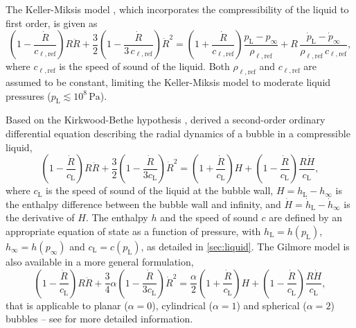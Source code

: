The Keller-Miksis model \citep{Keller1980, Prosperetti1986}, which incorporates the compressibility of the liquid to first order, is given as
\begin{equation}
\left(1 - \frac{\dot{R}}{c_{\ell,\mathrm{ref}}}\right) R \ddot{R} + \frac{3}{2} \left(1 - \frac{\dot{R}}{3\, c_{\ell,\mathrm{ref}}}\right) \dot{R}^2 =  \left(1 + \frac{\dot{R}}{c_{\ell,\mathrm{ref}}}\right) \frac{p_\text{L} - p_\infty}{\rho_{\ell,\mathrm{ref}}} + R \, \frac{\dot{p}_\text{L} - \dot{p}_\infty}{\rho_{\ell,\mathrm{ref}} \, c_{\ell,\mathrm{ref}}} ,
\label{eq:keller}
\end{equation}
where $c_{\ell,\mathrm{ref}}$ is the speed of sound of the liquid. Both $\rho_{\ell,\mathrm{ref}}$ and $c_{\ell,\mathrm{ref}}$ are assumed to be constant, limiting the Keller-Miksis model to moderate liquid pressures ($p_\mathrm{L} \lesssim 10^8 \, \mathrm{Pa}$).

Based on the Kirkwood-Bethe hypothesis \citep{Kirkwood1942,Denner2024a}, \citet{Gilmore1952} derived a second-order ordinary differential equation describing the radial dynamics of a bubble in a compressible liquid, %
\begin{equation}
  \left( 1 - \frac{\dot{R}}{c_\text{L}} \right) R \ddot{R} + \frac{3}{2} \left( 1 - \frac{\dot{R}}{3 c_\text{L}} \right) \dot{R}^2  = \left( 1 + \frac{\dot{R}}{c_\text{L}} \right) H + \left( 1- \frac{\dot{R}}{c_\text{L}} \right) \frac{R \dot{H}}{c_\text{L}}, \label{eq:gilmore}
\end{equation} 
where $c_\mathrm{L}$ is the speed of sound of the liquid at the bubble wall, $H = h_\text{L} - h_\infty$ is the enthalpy difference between the bubble wall and infinity, and $\dot{H} = \dot{h}_\text{L} - \dot{h}_\infty$ is the derivative of $H$. The enthalpy $h$ and the speed of sound $c$ are defined by an appropriate equation of state as a function of pressure, with $h_\text{L} = h(p_\text{L})$, $h_\infty = h(p_\infty)$ and $c_\text{L} = c(p_\text{L})$, as detailed in \ref{sec:liquid}. The Gilmore model is also available in a more general formulation,
\begin{equation}
    \left( 1 - \frac{\dot{R}}{c_{\mathrm{L}}} \right) R \ddot{R} + \frac{3}{4} \alpha \left( 1 - \frac{\dot{R}}{3 c_{\mathrm{L}}} \right) \dot{R}^2 = \frac{\alpha}{2} \left( 1 + \frac{\dot{R}}{c_{\mathrm{L}}} \right) H + \left( 1- \frac{\dot{R}}{c_{\mathrm{L}}} \right) \frac{R \dot{H}}{c_{\mathrm{L}}}, \label{eq:gilmore_general}
\end{equation}  
that is applicable to planar ($\alpha=0$), cylindrical ($\alpha=1$) and spherical ($\alpha=2$) bubbles -- see \citep{Denner2024a} for more detailed information.

